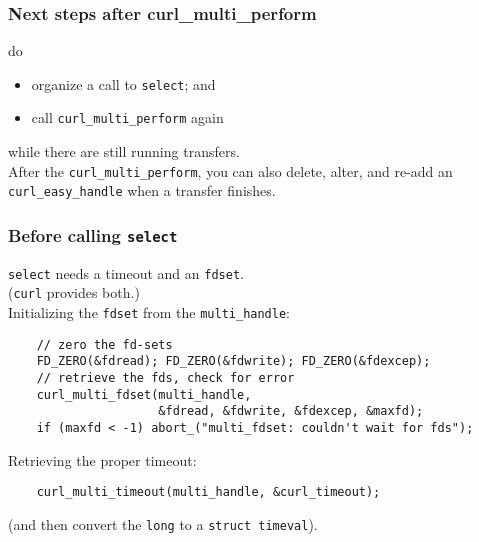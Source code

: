 \documentclass[aspectratio=43]{beamer}
\newenvironment{changemargin}[1]{%
  \begin{list}{}{%
    \setlength{\topsep}{0pt}%
    \setlength{\leftmargin}{#1}%
    \setlength{\rightmargin}{1em}
    \setlength{\listparindent}{\parindent}%
    \setlength{\itemindent}{\parindent}%
    \setlength{\parsep}{\parskip}%
  }%
  \item[]}{\end{list}}
\begin{document}
\begin{frame}
  \frametitle{Next steps after curl\_multi\_perform}

  \begin{changemargin}{2cm}
    do
    \begin{itemize}
      \item organize a call to {\tt select}; and
      \item call {\tt curl\_multi\_perform} again
    \end{itemize}
    while there are still running transfers.\\[1em]

    After the {\tt curl\_multi\_perform}, you can also delete, alter,
    and re-add an {\tt curl\_easy\_handle} when a transfer finishes.
  \end{changemargin}

\end{frame}


\begin{frame}[fragile]
  \frametitle{Before calling {\tt select}}

  \begin{changemargin}{2cm}
    {\tt select} needs a timeout and an {\tt fdset}. \\
    \qquad ({\tt curl} provides both.)\\[1em]

    Initializing the {\tt fdset} from the {\tt multi\_handle}:
  \end{changemargin}

\begin{lstlisting}
    // zero the fd-sets
    FD_ZERO(&fdread); FD_ZERO(&fdwrite); FD_ZERO(&fdexcep);
    // retrieve the fds, check for error
    curl_multi_fdset(multi_handle, 
                     &fdread, &fdwrite, &fdexcep, &maxfd);
    if (maxfd < -1) abort_("multi_fdset: couldn't wait for fds");
\end{lstlisting}

  \begin{changemargin}{2cm}
    Retrieving the proper timeout:
  \end{changemargin}
\begin{lstlisting}
    curl_multi_timeout(multi_handle, &curl_timeout);
\end{lstlisting}
  \begin{changemargin}{2cm}
    (and then convert the {\tt long} to a {\tt struct timeval}).
  \end{changemargin}

\end{frame}
\end{document}
